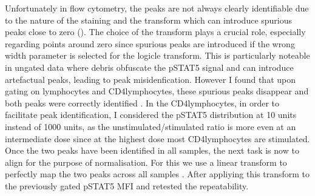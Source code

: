Unfortunately in flow cytometry, the peaks are not always clearly identifiable due to the nature of the staining and the transform which can introduce
spurious peaks close to zero ().
The choice of the transform plays a crucial role, especially regarding points around zero since spurious peaks are introduced if the wrong width parameter is selected
for the logicle transform.
This is particularly noteable in ungated data where debris obfuscate the pSTAT5 signal and can introduce artefactual peaks,
leading to peak misidenfication.
However I found that upon gating on lymphocytes and CD4\positive lymphocytes, these spurious peaks disappear and both peaks were correctly identified 
.
In the CD4\positive lymphocytes, in order to facilitate peak identification, I considered the pSTAT5 distribution at 10 units instead of 1000 units,
as the unstimulated/stimulated ratio is more even at an intermediate dose since at the highest dose most CD4\positive lymphocytes are stimulated.
Once the two peaks have been identified in all samples, the next task is now to align for the purpose of normalisation.
For this we use a linear transform to perfectly map the two peaks across all samples .
After appliying this transform to the previously gated pSTAT5 MFI and retested the repeatability.

